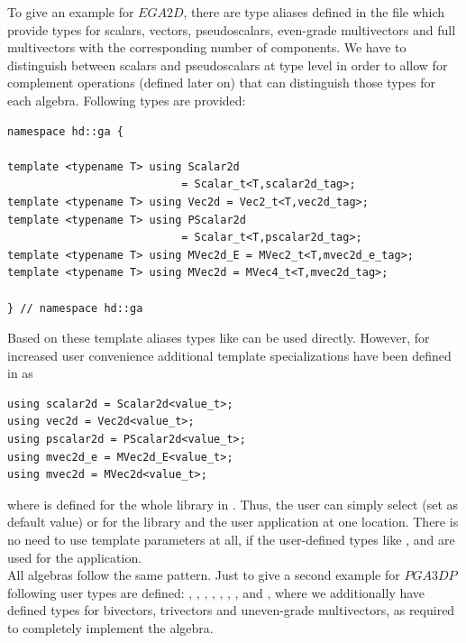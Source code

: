 To give an example for $EGA2D$, there are type aliases defined in the file
 which provide types for scalars, vectors,
pseudoscalars, even-grade multivectors and full multivectors with the corresponding number
of components. We have to distinguish between scalars and pseudoscalars at type level in
order to allow for complement operations (defined later on) that can distinguish those
types for each algebra. Following types are provided:
\begin{verbatim}
namespace hd::ga {

template <typename T> using Scalar2d
                           = Scalar_t<T,scalar2d_tag>;
template <typename T> using Vec2d = Vec2_t<T,vec2d_tag>;
template <typename T> using PScalar2d
                           = Scalar_t<T,pscalar2d_tag>;
template <typename T> using MVec2d_E = MVec2_t<T,mvec2d_e_tag>;
template <typename T> using MVec2d = MVec4_t<T,mvec2d_tag>;

} // namespace hd::ga
\end{verbatim}
Based on these template aliases types like  can be used directly. However,
for increased user convenience additional template specializations have been defined in
 as
\begin{verbatim}
using scalar2d = Scalar2d<value_t>;
using vec2d = Vec2d<value_t>;
using pscalar2d = PScalar2d<value_t>;
using mvec2d_e = MVec2d_E<value_t>;
using mvec2d = MVec2d<value_t>;
\end{verbatim}
where  is defined for the whole library in . Thus, the
user can simply select  (set as default value) or  for
the library and the user application at one location. There is no need to use template
parameters at all, if the user-defined types like , and  are used for the application. \\

All algebras follow the same pattern. Just to give a second example for $PGA3DP$ following
user types are defined: , , ,
, , , , and
, where we additionally have defined types for bivectors, trivectors and
uneven-grade multivectors, as required to completely implement the algebra. \\

